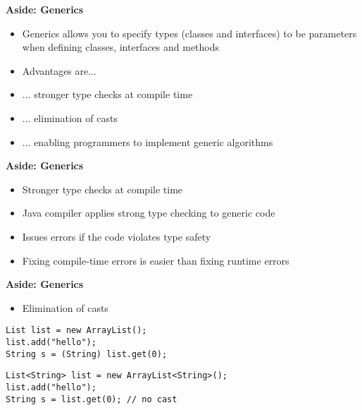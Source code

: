 \documentclass{beamer}
\begin{document}
\begin{frame}
\begin{center}
\textbf{Aside: Generics}
\end{center}
\begin{itemize}
\item Generics allows you to specify types (classes and interfaces) to be parameters when defining classes, interfaces and methods
\bigskip
\item Advantages are...
\item ... stronger type checks at compile time
\item ... elimination of casts
\item ... enabling programmers to implement generic algorithms
\end{itemize}
\end{frame} 

\begin{frame}
\begin{center}
\textbf{Aside: Generics}
\end{center}
\begin{itemize}
\item Stronger type checks at compile time
\bigskip
\item Java compiler applies strong type checking to generic code 
\item Issues errors if the code violates type safety
\item Fixing compile-time errors is easier than fixing runtime errors
\end{itemize}
\end{frame} 

\begin{frame}[fragile]
\begin{center}
\textbf{Aside: Generics}
\end{center}
\begin{itemize}
\item Elimination of casts
\end{itemize}
\begin{block}{}
\begin{lstlisting}
List list = new ArrayList();
list.add("hello");
String s = (String) list.get(0);
\end{lstlisting}
\end{block}
\begin{block}{}
\begin{lstlisting}
List<String> list = new ArrayList<String>();
list.add("hello");
String s = list.get(0); // no cast
\end{lstlisting}
\end{block}
\end{frame} 
\end{document}
